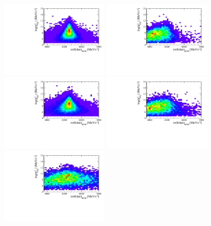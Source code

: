\begin{figure}[t!]
\centering
\includegraphics[width=0.49\textwidth]{RKst/figs/HOP/HOP_sig_low.pdf}
\includegraphics[width=0.49\textwidth]{RKst/figs/HOP/HOP_bkg_low.pdf}
\includegraphics[width=0.49\textwidth]{RKst/figs/HOP/HOP_sig_central.pdf}
\includegraphics[width=0.49\textwidth]{RKst/figs/HOP/HOP_bkg_central.pdf}
\includegraphics[width=0.49\textwidth]{RKst/figs/HOP/HOP_sig_high.pdf}

\end{figure}
